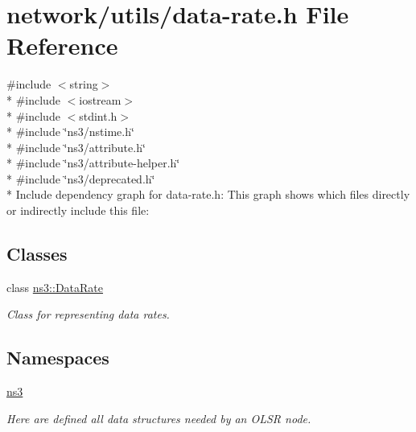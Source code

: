 \hypertarget{data-rate_8h}{}\section{network/utils/data-\/rate.h File Reference}
\label{data-rate_8h}
{\ttfamily \#include $<$string$>$}\\*
{\ttfamily \#include $<$iostream$>$}\\*
{\ttfamily \#include $<$stdint.\+h$>$}\\*
{\ttfamily \#include \char`\"{}ns3/nstime.\+h\char`\"{}}\\*
{\ttfamily \#include \char`\"{}ns3/attribute.\+h\char`\"{}}\\*
{\ttfamily \#include \char`\"{}ns3/attribute-\/helper.\+h\char`\"{}}\\*
{\ttfamily \#include \char`\"{}ns3/deprecated.\+h\char`\"{}}\\*
Include dependency graph for data-\/rate.h\+:
This graph shows which files directly or indirectly include this file\+:
\subsection*{Classes}
\begin{DoxyCompactItemize}
\item 
class \hyperlink{classns3_1_1DataRate}{ns3\+::\+Data\+Rate}
\begin{DoxyCompactList}\small\item\em Class for representing data rates. \end{DoxyCompactList}\end{DoxyCompactItemize}
\subsection*{Namespaces}
\begin{DoxyCompactItemize}
\item 
 \hyperlink{namespacens3}{ns3}
\begin{DoxyCompactList}\small\item\em Here are defined all data structures needed by an O\+L\+SR node. \end{DoxyCompactList}\end{DoxyCompactItemize}
